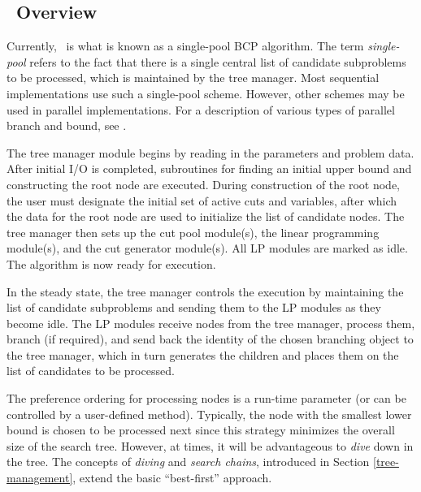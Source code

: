 \subsection{\BB\ Overview}

Currently, \BB\ is what is known as a single-pool BCP algorithm.
The term {\em single-pool} refers to the fact that there is a single
central list of candidate subproblems to be processed, which is
maintained by the tree manager. Most sequential implementations use
such a single-pool scheme. However, other schemes may be used in
parallel implementations. For a description of various types of
parallel branch and bound, see \cite{A:gendron-crainic}.

The tree manager module begins by reading in the parameters and
problem data. After initial I/O is completed, subroutines for finding
an initial upper bound and constructing the root node are executed.
During construction of the root node, the user must designate the
initial set of active cuts and variables, after which the data for the
root node are used to initialize the list of candidate nodes. The tree
manager then sets up the cut pool module(s), the linear programming
module(s), and the cut generator module(s). All LP modules are marked
as idle. The algorithm is now ready for execution.

In the steady state, the tree manager controls the execution by
maintaining the list of candidate subproblems and sending them to the
LP modules as they become idle. The LP modules receive nodes from
the tree manager, process them, branch (if required), and send back
the identity of the chosen branching object to the tree manager, which
in turn generates the children and places them on the list of
candidates to be processed.

The preference ordering for processing nodes is a run-time parameter (or can
be controlled by a user-defined method).
Typically, the node with the smallest lower bound is chosen to be
processed next since this strategy minimizes the overall size of the
search tree. However, at times, it will be advantageous to {\em dive}
down in the tree. The concepts of {\em diving} and {\em search
chains}, introduced in Section \ref{tree-management}, extend the basic
``best-first'' approach.



